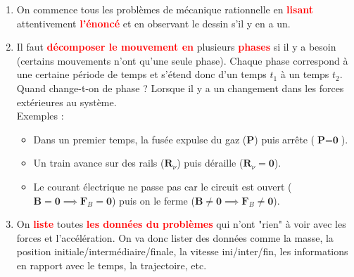 \documentclass[a4paper]{article}
\begin{document}
\begin{enumerate}





\item On commence tous les problèmes de mécanique rationnelle en \textcolor{red}{\textbf{lisant}} attentivement \textcolor{red}{\textbf{l'énoncé}} et en observant le dessin s'il y en a un.





\item Il faut \textcolor{red}{\textbf{décomposer le mouvement en}} plusieurs \textcolor{red}{\textbf{phases}} si il y a besoin (certains mouvements n'ont qu'une seule phase). Chaque phase correspond à une certaine période de temps et s'étend donc d'un temps $ t_1 $ à un temps $ t_2 $. Quand change-t-on de phase ? Lorsque il y a un changement dans les forces extérieures au système. \\
Exemples : 
\begin{itemize}
\item Dans un premier temps, la fusée expulse du gaz (\textbf{P}) puis arrête ($ \textbf{P} = \textbf{0} $).
\item Un train avance sur des rails ($ \textbf{R}_\nu $) puis déraille ($ \textbf{R}_\nu = \textbf{0} $).
\item Le courant électrique ne passe pas car le circuit est ouvert ($ \textbf{B} = \textbf{0} \implies \textbf{F}_B = \textbf{0} $) puis on le ferme ($ \textbf{B} \neq \textbf{0} \implies \textbf{F}_B \neq \textbf{0} $).
\end{itemize}





\item On \textcolor{red}{\textbf{liste}} toutes \textcolor{red}{\textbf{les données du problèmes}} qui n'ont "rien" à voir avec les forces et l'accélération. On va donc lister des données comme la masse, la position initiale/intermédiaire/finale, la vitesse ini/inter/fin, les informations en rapport avec le temps, la trajectoire, etc.






\end{enumerate}
\end{document}
